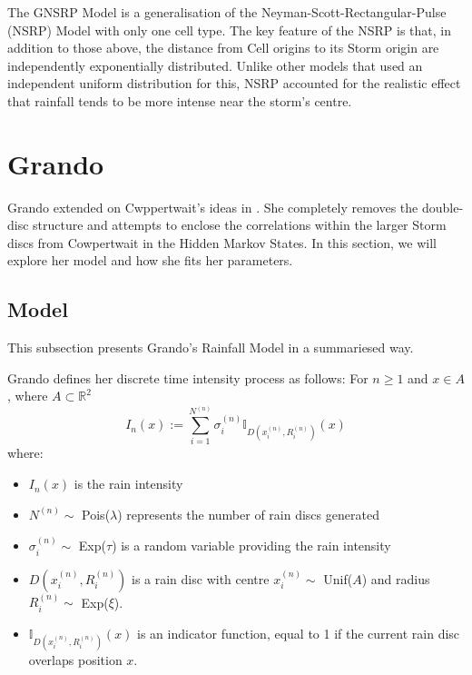 The GNSRP Model is a generalisation of the Neyman-Scott-Rectangular-Pulse (NSRP) Model with only one cell type. The key feature of the NSRP is that, in addition to those above, the distance from Cell origins to its Storm origin are independently exponentially distributed. Unlike other models that used an independent uniform distribution for this, NSRP accounted for the realistic effect that rainfall tends to be more intense near the storm's centre.

\section{Grando}
\label{Replicating_Existing_Rainfall_Model:Grando}
Grando extended on Cwppertwait's ideas in \cite{Grando2019}. She completely removes the double-disc structure and attempts to enclose the correlations within the larger Storm discs from Cowpertwait in the Hidden Markov States. In this section, we will explore her model and how she fits her parameters.

    \subsection{Model}
    \label{Replicating_Existing_Rainfall_Model:Grando:Model}
    This subsection presents Grando's Rainfall Model in a summariesed way.

    Grando defines her discrete time intensity process as follows:
    For $n \geq 1$ and $x \in A$, where $A \subset \mathbb{R}^2$
    \begin{equation}
        I_n(x) := \sum_{i=1}^{N^{(n)}} \sigma_i^{(n)} \mathbb{I}_{D(x_i^{(n)},R_i^{(n)})} (x)
    \end{equation}
    where:
    \begin{itemize}
        \item $I_n(x)$ is the rain intensity
        \item $N^{(n)} \sim$ Pois($\lambda$) represents the number of rain discs generated
        \item $\sigma_i^{(n)} \sim$ Exp($\tau$) is a random variable providing the rain intensity
        \item  $D(x_i^{(n)},R_i^{(n)})$ is a rain disc with centre $x_i^{(n)} \sim$ Unif($A$) and radius $R_i^{(n)} \sim$ Exp($\xi$).
        \item $\mathbb{I}_{D(x_i^{(n)},R_i^{(n)})} (x)$ is an indicator function, equal to 1 if the current rain disc overlaps position $x$.
    \end{itemize}

